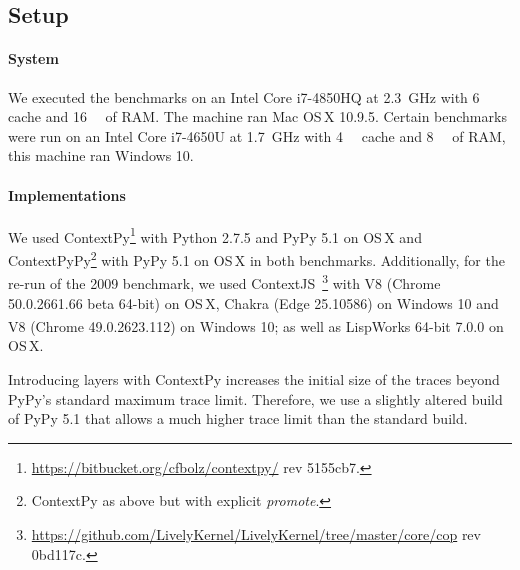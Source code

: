 \documentclass[preprint,english,10pt,nonatbib]{sigplanconf}
\begin{document}
\subsection{Setup}
\label{sec:setup}


\paragraph{System} We executed the benchmarks on %
an Intel Core i7-4850HQ at \SI{2.3}{\GHz} with \SI{6}{\mega\byte} cache and
\SI{16}{\giga\byte} of RAM. The machine ran Mac OS\,X 10.9.5.
Certain benchmarks were run on an Intel Core i7-4650U at \SI{1.7}{\GHz} with
\SI{4}{\mega\byte} cache and \SI{8}{\giga\byte} of RAM, this machine ran
Windows 10.
%

\paragraph{Implementations} %

We used ContextPy\footnote{{\smaller\url{https://bitbucket.org/cfbolz/contextpy/}}
  rev 5155cb7.} with Python 2.7.5 and PyPy 5.1 on OS\,X and
ContextPyPy\footnote{ContextPy as above but with explicit \emph{promote}.} with
PyPy 5.1 on OS\,X in both benchmarks. Additionally, for the re-run of the 2009
benchmark, we used
ContextJS~\cite{lincke+:2011:open-implementation}\footnote{{\smaller\url{https://github.com/LivelyKernel/LivelyKernel/tree/master/core/cop}}
  rev 0bd117c.} with V8 (Chrome 50.0.2661.66 beta 64-bit) on OS\,X, Chakra
(Edge 25.10586) on Windows 10 and V8 (Chrome 49.0.2623.112) on Windows 10; as
well as LispWorks\textsuperscript{\textregistered} 64-bit 7.0.0 on OS\,X.

Introducing layers with ContextPy increases the initial size of the traces
beyond PyPy's standard maximum trace limit. Therefore, we use a slightly
altered build of PyPy 5.1 that allows a much higher trace limit than the
standard build.
\end{document}
